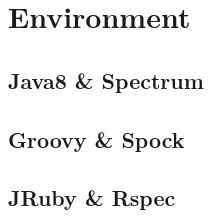 \chapter{Environment}
\label{chapter:environment}

\section{Java8 \& Spectrum}
\section{Groovy \& Spock}
\section{JRuby \& Rspec}


